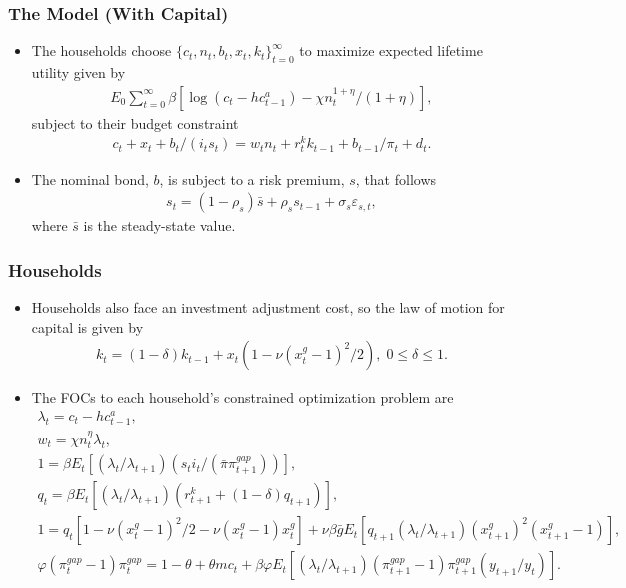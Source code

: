 \documentclass[11pt]{beamer}
\begin{document}
\begin{frame}\frametitle{The Model (With Capital)}
\begin{itemize}\setlength{\itemsep}{6pt}
\item The households choose $\{c_t, n_t, b_t, x_t, k_t\}_{t=0}^\infty$ to maximize expected lifetime utility given by
\begin{gather*}
E_0\sum_{t=0}^\infty\beta[\log(c_t-hc^a_{t-1}) - \chi n_t^{1+\eta}/(1+\eta)],
\end{gather*} 
subject to their budget constraint
\begin{gather*}
    c_t+x_t+b_t/(i_ts_t)=w_tn_t+r_t^kk_{t-1}+b_{t-1}/\pi_t+d_t.
  \end{gather*} 
\item The nominal bond, $b$, is subject to a risk premium, $s$, that follows
\begin{gather*}
  s_t = (1-\rho_s)\bar{s} + \rho_ss_{t-1} + \sigma_s\varepsilon_{s,t},
\end{gather*}
where $\bar{s}$ is the steady-state value. %
\end{itemize}
\end{frame}
\begin{frame}\frametitle{Households}
\begin{itemize}\setlength{\itemsep}{8pt}
\item Households also face an investment adjustment cost, so the law of motion for capital is given by
\begin{gather*}
  k_t = (1-\delta)k_{t-1} + x_t(1-\nu(x^g_t - 1)^2/2),\; 0 \leq \delta \leq 1.
  \end{gather*} %
\item The FOCs to each household's constrained optimization problem are
\scriptsize
\begin{gather*}
  \lambda_t = c_t - hc^a_{t-1}, \\
  w_t = \chi n_t^\eta \lambda_t,\\
  1 =  \beta E_t[(\lambda_t/\lambda_{t+1})(s_ti_t/(\bar{\pi}\pi_{t+1}^{gap}))],\\
  q_t = \beta E_t[(\lambda_t/\lambda_{t+1})(r^k_{t+1}+(1-\delta)q_{t+1})],\\
  1 = q_t[1-\nu(x^g_t-1)^2/2 - \nu(x_t^g-1)x_t^g] + \nu\beta\bar{g}E_t[q_{t+1}(\lambda_t/\lambda_{t+1})(x^g_{t+1})^2(x^g_{t+1}-1)],\\
  \varphi(\pi_t^{gap}-1)\pi_t^{gap} = 1-\theta + \theta mc_t + \beta\varphi E_t[(\lambda_t/\lambda_{t+1})(\pi_{t+1}^{gap}-1)\pi_{t+1}^{gap}(y_{t+1}/y_t)].
\end{gather*} %
\normalsize
\end{itemize}
\end{frame}
\end{document}
